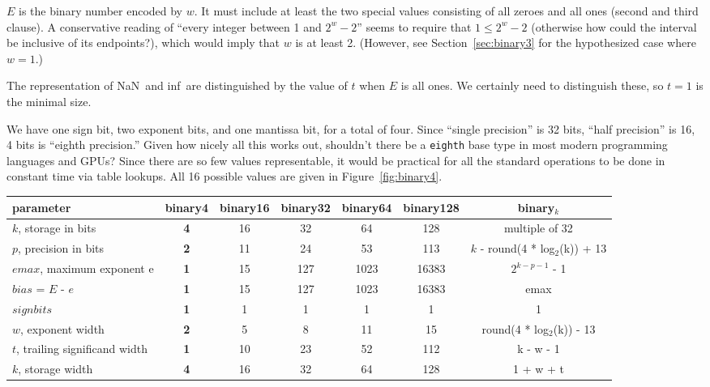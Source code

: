 \documentclass[twocolumn]{article}
\newcommand\nan{\textsf{NaN}}
\renewcommand\inf{\textsf{inf}}
\begin{document}
$E$ is the binary number encoded by $w$. It must include at least the
two special values consisting of all zeroes and all ones (second and
third clause). A conservative reading of ``every integer between 1 and
$2^w - 2$'' seems to require that $1 \leq 2^w - 2$ (otherwise how
could the interval be inclusive of its endpoints?), which would imply
that $w$ is at least 2. (However, see Section~\ref{sec:binary3} for
the hypothesized case where $w=1$.)

The representation of \nan\ and \inf\ are distinguished by the value
of $t$ when $E$ is all ones. We certainly need to distinguish these,
so $t = 1$ is the minimal size.

We have one sign bit, two exponent bits, and one mantissa bit, for a
total of four. Since ``single precision'' is 32 bits, ``half
precision'' is 16, 4 bits is ``eighth precision.'' Given how nicely
all this works out, shouldn't there be a {\tt eighth} base type in
most modern programming languages and GPUs? Since there are so few
values representable, it would be practical for all the standard
operations to be done in constant time via table lookups. All 16
possible values are given in Figure~\ref{fig:binary4}.


\begin{figure*}[tp]
\begin{tabular}{|l|c|c|c|c|c|c|}
  \hline
  parameter & {\bf binary4} & binary16 & binary32 & binary64 & binary128 & binary$_k$ \\
  \hline
  $k$, storage in bits & {\bf 4} & 16 & 32 & 64 & 128 & multiple of 32 \\
  $p$, precision in bits & {\bf 2} & 11 & 24 & 53 & 113 & $k$ - round(4 * log$_2$(k)) + 13 \\
  $emax$, maximum exponent e & {\bf 1} & 15 & 127 & 1023 & 16383 & $2^{k-p-1}$ - 1 \\
  $bias$ = $E$ - $e$ & {\bf 1} & 15 & 127 & 1023 & 16383 & emax \\
  $sign bits$ & {\bf 1} & 1 & 1 & 1 & 1 & 1 \\
  $w$, exponent width & {\bf 2} & 5 & 8 & 11 & 15 & round(4 * log$_2$(k)) - 13 \\
  $t$, trailing significand width & {\bf 1} & 10 & 23 & 52 & 112 & k - w - 1 \\
  $k$, storage width & {\bf 4} & 16 & 32 & 64 & 128 & 1 + w + t \\
\hline
\end{tabular}
\caption{Parameters for the newly-introduced {\bf binary4} encoding
  for IEEE-754, compared to the standard widths (see Table~3.5 in the
  standard\cite{ieee754}). } \label{fig:binary4}
\end{figure*}
\end{document}
